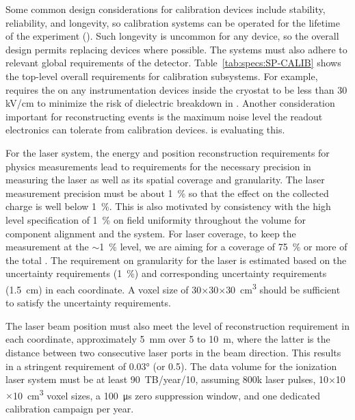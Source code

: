 Some common design considerations for calibration devices include stability, reliability, and longevity, so calibration systems can be operated for the lifetime of the experiment (\dunelifetime). Such longevity is uncommon for any device, so the overall design permits replacing devices where possible. The systems must also adhere to relevant global requirements of the  detector. Table~\ref{tab:specs:SP-CALIB} shows the top-level overall requirements for calibration subsystems. For example,  requires the \efield  on any instrumentation devices inside the cryostat to be less than 30 kV/cm to minimize the risk of dielectric breakdown in \lar. Another consideration important for reconstructing events is the maximum noise level the readout electronics can tolerate from calibration devices.  is evaluating this. 

 For the laser system, the energy and position reconstruction requirements for physics measurements lead to requirements for the necessary precision in measuring the laser \efield as well as its spatial coverage and granularity. The laser \efield measurement precision must be about \SI{1}{\%} so that the effect on the collected charge is well below \SI{1}{\%}. This is also motivated by consistency with the high level  specification of \SI{1}{\%} on field uniformity throughout the volume for component alignment and the \hv system. For laser coverage, to keep the \efield measurement at the $\sim$\SI{1}{\%} level, we are aiming for a coverage of \SI{75}{\%} or more of the total . The requirement on granularity for the laser is estimated based on the  uncertainty requirements (\SI{1}{\%}) and corresponding uncertainty requirements (\SI{1.5}{\cm}) in each coordinate. A voxel size of \num{30}$\times$\num{30}$\times$\SI{30}{\cubic\cm} should be sufficient to satisfy the  uncertainty requirements. 

The laser beam position must also meet the level of reconstruction requirement in each coordinate, approximately \SI{5}{\milli\m} over \num{5} to \SI{10}{\m}, where the latter is the distance between two consecutive laser ports in the beam direction. This results in a stringent requirement of \ang{0.03} (or \SI{0.5}{\mrad}). The data volume for the ionization laser system must be at least \num{90}~TB/year/\SI{10}{\kt}, assuming \num{800}k laser pulses, \num{10}$\times$\num{10}$\times$\SI{10}{\cubic\cm} voxel sizes, a \SI{100}{\micro\s} zero suppression window, and one dedicated calibration campaign per year.

